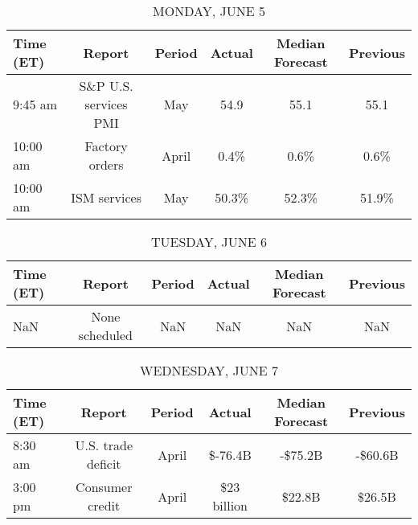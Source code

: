 \documentclass{article}%
\begin{document}
%
\normalsize%


\begin{table}[htbp]%
\caption{MONDAY, JUNE 5}%
\centering%
\begin{adjustbox}{width=1\textwidth}%
\begin{tabular}{lccccc}
\toprule
Time (ET) &                Report & Period & Actual & Median Forecast & Previous \\
\midrule
  9:45 am & S\&P U.S. services PMI &    May &   54.9 &            55.1 &     55.1 \\
 10:00 am &        Factory orders &  April &   0.4\% &            0.6\% &     0.6\% \\
 10:00 am &          ISM services &    May &  50.3\% &           52.3\% &    51.9\% \\
\bottomrule
\end{tabular}
%
\end{adjustbox}%
\end{table}

%


\begin{table}[htbp]%
\caption{TUESDAY, JUNE 6}%
\centering%
\begin{adjustbox}{width=1\textwidth}%
\begin{tabular}{lccccc}
\toprule
Time (ET) &         Report & Period & Actual & Median Forecast & Previous \\
\midrule
      NaN & None scheduled &    NaN &    NaN &             NaN &      NaN \\
\bottomrule
\end{tabular}
%
\end{adjustbox}%
\end{table}

%


\begin{table}[htbp]%
\caption{WEDNESDAY, JUNE 7}%
\centering%
\begin{adjustbox}{width=1\textwidth}%
\begin{tabular}{lccccc}
\toprule
Time (ET) &             Report & Period &      Actual & Median Forecast & Previous \\
\midrule
  8:30 am & U.S. trade deficit &  April &     \$-76.4B &         -\$75.2B &  -\$60.6B \\
  3:00 pm &    Consumer credit &  April & \$23 billion &          \$22.8B &   \$26.5B \\
\bottomrule
\end{tabular}
%
\end{adjustbox}%
\end{table}
\end{document}
